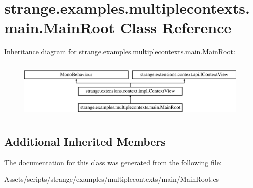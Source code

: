 \hypertarget{classstrange_1_1examples_1_1multiplecontexts_1_1main_1_1_main_root}{\section{strange.\-examples.\-multiplecontexts.\-main.\-Main\-Root Class Reference}
\label{classstrange_1_1examples_1_1multiplecontexts_1_1main_1_1_main_root}
}
Inheritance diagram for strange.\-examples.\-multiplecontexts.\-main.\-Main\-Root\-:\begin{figure}[H]
\begin{center}
\leavevmode
\includegraphics[height=2.828283cm]{classstrange_1_1examples_1_1multiplecontexts_1_1main_1_1_main_root}
\end{center}
\end{figure}
\subsection*{Additional Inherited Members}


The documentation for this class was generated from the following file\-:\begin{DoxyCompactItemize}
\item 
Assets/scripts/strange/examples/multiplecontexts/main/Main\-Root.\-cs\end{DoxyCompactItemize}
